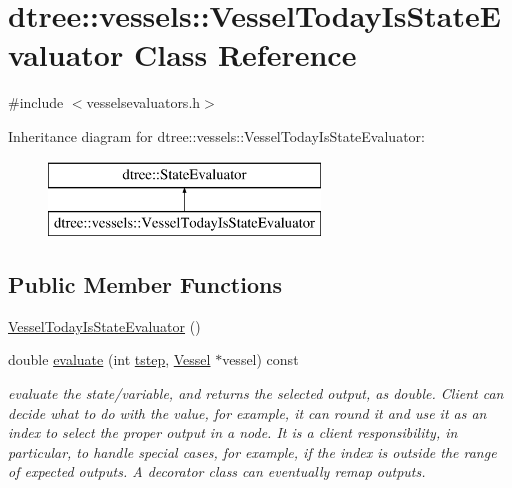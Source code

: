 \hypertarget{classdtree_1_1vessels_1_1_vessel_today_is_state_evaluator}{}\section{dtree\+::vessels\+::Vessel\+Today\+Is\+State\+Evaluator Class Reference}
\label{classdtree_1_1vessels_1_1_vessel_today_is_state_evaluator}


{\ttfamily \#include $<$vesselsevaluators.\+h$>$}

Inheritance diagram for dtree\+::vessels\+::Vessel\+Today\+Is\+State\+Evaluator\+:\begin{figure}[H]
\begin{center}
\leavevmode
\includegraphics[height=2.000000cm]{db/d9a/classdtree_1_1vessels_1_1_vessel_today_is_state_evaluator}
\end{center}
\end{figure}
\subsection*{Public Member Functions}
\begin{DoxyCompactItemize}
\item 
\mbox{\hyperlink{classdtree_1_1vessels_1_1_vessel_today_is_state_evaluator_a3e9950557cd0615ecbbe02411ca4d238}{Vessel\+Today\+Is\+State\+Evaluator}} ()
\item 
double \mbox{\hyperlink{classdtree_1_1vessels_1_1_vessel_today_is_state_evaluator_ae3eb964dad250654605cc0756adbf54f}{evaluate}} (int \mbox{\hyperlink{thread__vessels_8cpp_a84bc73d278de929ec9974e1a95d9b23a}{tstep}}, \mbox{\hyperlink{class_vessel}{Vessel}} $\ast$vessel) const
\begin{DoxyCompactList}\small\item\em evaluate the state/variable, and returns the selected output, as double. Client can decide what to do with the value, for example, it can round it and use it as an index to select the proper output in a node. It is a client responsibility, in particular, to handle special cases, for example, if the index is outside the range of expected outputs. A decorator class can eventually remap outputs. \end{DoxyCompactList}\end{DoxyCompactItemize}
